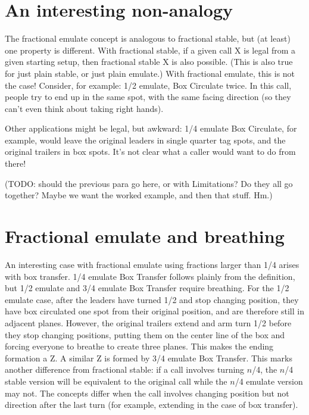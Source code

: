 \documentclass[11pt]{article}
\begin{document}
\section{An interesting non-analogy}
\label{sec:nonanalogy}

The fractional emulate concept is analogous to fractional stable,
but (at least) one property is different.
With fractional stable,
if a given call X is legal from a given starting setup,
then fractional stable X is also possible.
(This is also true for just plain stable, or just plain emulate.)
With fractional emulate, this is not the case!
Consider, for example: 1/2 emulate, Box Circulate twice.
In this call, people try to end up in the same spot,
with the same facing direction
(so they can't even think about taking right hands).

Other applications might be legal, but awkward:
1/4 emulate Box Circulate, for example,
would leave the original leaders in single quarter tag spots,
and the original trailers in box spots.
It's not clear what a caller would want to do from there!

(TODO: should the previous para go here, or with Limitations?
Do they all go together?  Maybe we want the worked example,
and then that stuff.  Hm.)

\section{Fractional emulate and breathing}

An interesting case with fractional emulate using fractions larger
than 1/4 arises with box transfer. 1/4 emulate Box Transfer
follows plainly from the definition,
but 1/2 emulate and 3/4 emulate
Box Transfer require breathing. For the 1/2 emulate case, after the leaders
have turned 1/2 and stop changing position, they have box circulated
one spot from their original position, and are therefore still in
adjacent planes. However, the original trailers extend and arm turn 1/2
before they stop changing positions, putting them on the center line
of the box and forcing everyone to breathe to create three planes.
This makes the ending formation a Z.
A similar Z is formed by
3/4 emulate Box Transfer. This marks another difference from
fractional stable: if a call involves turning $n$/4, the $n$/4 stable
version will be equivalent to the original call while the $n$/4
emulate version may not. The concepts differ when the call involves
changing position but not direction after the last turn (for example,
extending in the case of box transfer).
\end{document}
